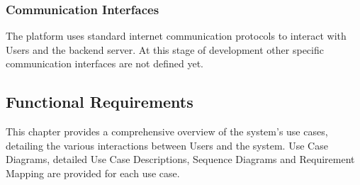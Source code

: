 \subsubsection{Communication Interfaces}
The platform uses standard internet communication protocols to interact with Users and the backend server. At this stage of development other specific communication interfaces are not defined yet.
\clearpage
\subsection{Functional Requirements}
This chapter provides a comprehensive overview of the system's use cases, detailing the various interactions between Users and the system.
Use Case Diagrams, detailed Use Case Descriptions, Sequence Diagrams and Requirement Mapping are provided for each use case.
